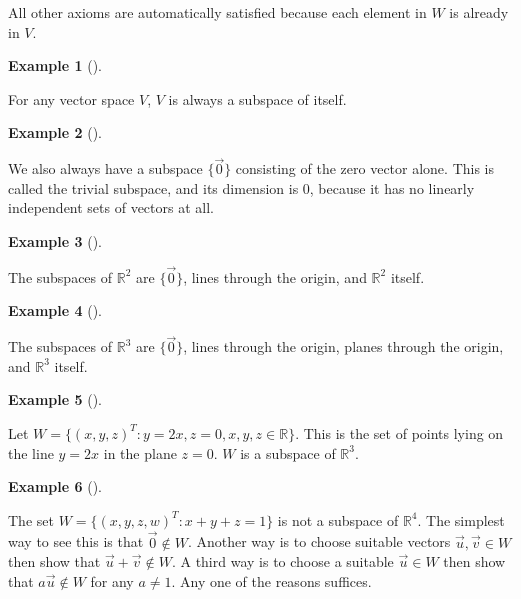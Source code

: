 \documentclass[
  a4paper,
  DIV=11,
  numbers=noendperiod,
  oneside]{scrreprt}
\theoremstyle{definition}
\newtheorem{example}{Example}[chapter]
\theoremstyle{remark}
\begin{document}
All other axioms are automatically satisfied because each element in
\(W\) is already in \(V\).

\begin{example}[]\protect\hypertarget{exm-}{}\label{exm-}

For any vector space \(V\), \(V\) is always a subspace of itself.

\end{example}

\begin{example}[]\protect\hypertarget{exm-}{}\label{exm-}

We also always have a subspace \(\{\vec{0}\}\) consisting of the zero
vector alone. This is called the trivial subspace, and its dimension is
\(0\), because it has no linearly independent sets of vectors at all.

\end{example}

\begin{example}[]\protect\hypertarget{exm-}{}\label{exm-}

The subspaces of \(\mathbb{R}^{2}\) are \(\{\vec{0}\}\), lines through
the origin, and \(\mathbb{R}^{2}\) itself.

\end{example}

\begin{example}[]\protect\hypertarget{exm-}{}\label{exm-}

The subspaces of \(\mathbb{R}^{3}\) are \(\{\vec{0}\}\), lines through
the origin, planes through the origin, and \(\mathbb{R}^{3}\) itself.

\end{example}

\begin{example}[]\protect\hypertarget{exm-}{}\label{exm-}

Let \(W=\{(x,y,z)^{T}:y=2x, z=0,x,y,z\in\mathbb{R}\}\). This is the set
of points lying on the line \(y=2x\) in the plane \(z=0\). \(W\) is a
subspace of \(\mathbb{R}^{3}\).

\end{example}

\begin{example}[]\protect\hypertarget{exm-}{}\label{exm-}

The set \(W=\{(x,y,z,w)^{T}:x+y+z=1\}\) is not a subspace of
\(\mathbb{R}^{4}\). The simplest way to see this is that
\({\vec 0\not\in }W\). Another way is to choose suitable vectors
\(\vec{u},\vec{v}\in W\) then show that \(\vec{u}+\vec{v}\not\in W\). A
third way is to choose a suitable \({\vec u} \in
W\) then show that \(a{\vec u\not\in }W\) for any \(a\neq 1\). Any one
of the reasons suffices.

\end{example}
\end{document}
